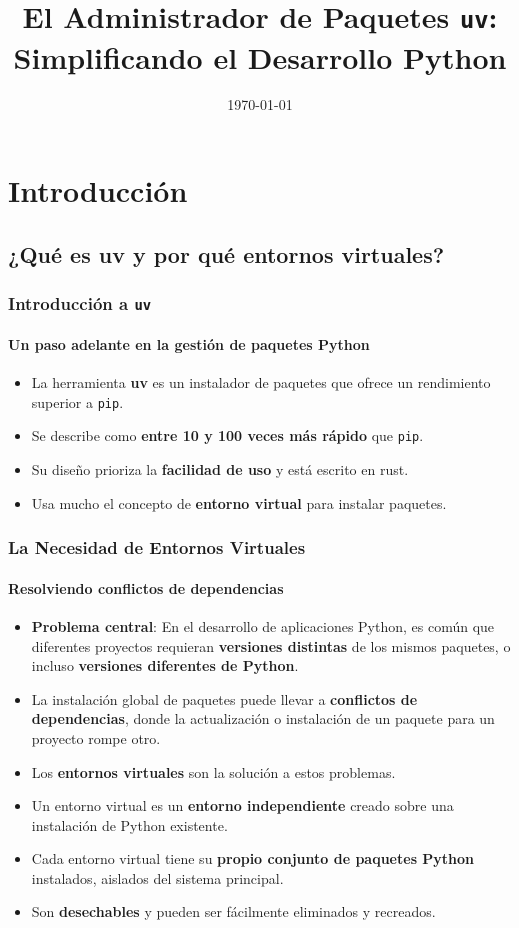 \documentclass{beamer}
\title{El Administrador de Paquetes \texttt{uv}: Simplificando el Desarrollo Python}
\date{\today}
\begin{document}
\frame{\titlepage}

\section{Introducción}
\subsection{¿Qué es uv y por qué entornos virtuales?}
\frame
{
    \frametitle{Introducción a \texttt{uv}}
    \framesubtitle{Un paso adelante en la gestión de paquetes Python}
    \begin{itemize}
        \item La herramienta \textbf{uv} es un instalador de paquetes que ofrece un rendimiento superior a \texttt{pip}.
        \item Se describe como \textbf{entre 10 y 100 veces más rápido} que \texttt{pip}.
        \item Su diseño prioriza la \textbf{facilidad de uso} y está escrito en rust.
        \item Usa mucho el concepto de  \textbf{entorno virtual} para instalar paquetes.
    \end{itemize}
}

\frame
{
    \frametitle{La Necesidad de Entornos Virtuales}
    \framesubtitle{Resolviendo conflictos de dependencias}
    \begin{itemize}
        \item \textbf{Problema central}: En el desarrollo de aplicaciones Python, es común que diferentes proyectos requieran \textbf{versiones distintas} de los mismos paquetes, o incluso \textbf{versiones diferentes de Python}.
        \item La instalación global de paquetes puede llevar a \textbf{conflictos de dependencias}, donde la actualización o instalación de un paquete para un proyecto rompe otro.
        \item Los \textbf{entornos virtuales} son la solución a estos problemas.
        \item Un entorno virtual es un \textbf{entorno independiente} creado sobre una instalación de Python existente.
        \item Cada entorno virtual tiene su \textbf{propio conjunto de paquetes Python} instalados, aislados del sistema principal.
        \item Son \textbf{desechables} y pueden ser fácilmente eliminados y recreados.
    \end{itemize}
}
\end{document}
